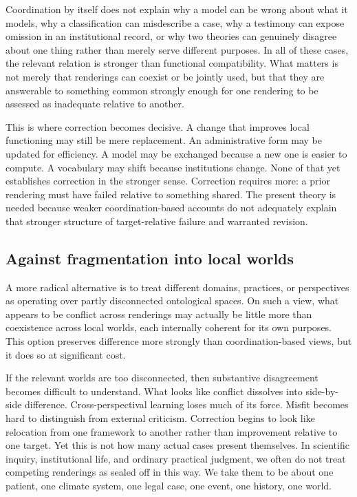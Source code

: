 \documentclass[11pt]{article}
\begin{document}
Coordination by itself does not explain why a model can be wrong about what it models, why a classification can misdescribe a case, why a testimony can expose omission in an institutional record, or why two theories can genuinely disagree about one thing rather than merely serve different purposes. In all of these cases, the relevant relation is stronger than functional compatibility. What matters is not merely that renderings can coexist or be jointly used, but that they are answerable to something common strongly enough for one rendering to be assessed as inadequate relative to another.

This is where correction becomes decisive. A change that improves local functioning may still be mere replacement. An administrative form may be updated for efficiency. A model may be exchanged because a new one is easier to compute. A vocabulary may shift because institutions change. None of that yet establishes correction in the stronger sense. Correction requires more: a prior rendering must have failed relative to something shared. The present theory is needed because weaker coordination-based accounts do not adequately explain that stronger structure of target-relative failure and warranted revision.

\subsection{Against fragmentation into local worlds}

A more radical alternative is to treat different domains, practices, or perspectives as operating over partly disconnected ontological spaces. On such a view, what appears to be conflict across renderings may actually be little more than coexistence across local worlds, each internally coherent for its own purposes. This option preserves difference more strongly than coordination-based views, but it does so at significant cost.

If the relevant worlds are too disconnected, then substantive disagreement becomes difficult to understand. What looks like conflict dissolves into side-by-side difference. Cross-perspectival learning loses much of its force. Misfit becomes hard to distinguish from external criticism. Correction begins to look like relocation from one framework to another rather than improvement relative to one target. Yet this is not how many actual cases present themselves. In scientific inquiry, institutional life, and ordinary practical judgment, we often do not treat competing renderings as sealed off in this way. We take them to be about one patient, one climate system, one legal case, one event, one history, one world.
\end{document}
